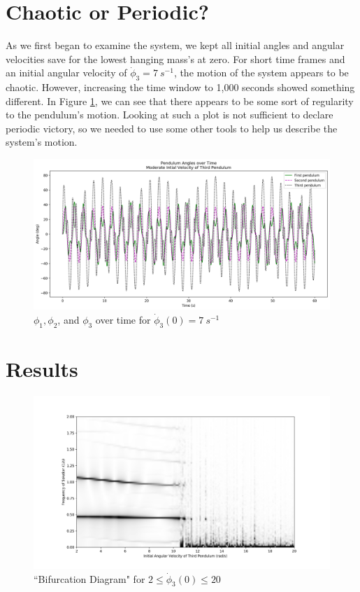 \documentclass{article}
\begin{document}
\section{Chaotic or Periodic?}
As we first began to examine the system, we kept all initial angles and angular
velocities save for the lowest hanging mass's at zero. For short time frames
and an initial angular velocity of $\dot\phi_3=\SI{7}{s^{-1}}$, the motion of
the system appears to be chaotic. However, increasing the time window to 1,000
seconds showed something different. In Figure \ref{fig:moderate_time}, we can
see that there appears to be some sort of regularity to the pendulum's motion.
Looking at such a plot is not sufficient to declare periodic victory, so we
needed to use some other tools to help us describe the system's motion.
 \begin{figure}
	\centering
	\includegraphics[width=\textwidth]{moderate_velocity_time_sol}
	\caption{$\phi_1,\phi_2$, and $\phi_3$ over time for $\dot\phi_3(0)=\SI{7}{s^{-1}}$}
	\label{fig:moderate_time}
\end{figure}

\section{Results}

\begin{figure}
	\centering
	\includegraphics[width=\textwidth]{bifurcation_1}
	\caption{``Bifurcation Diagram" for $2\le\dot\phi_3(0)\le 20$}
	\label{fig:bifurc_1}
\end{figure}
\end{document}
